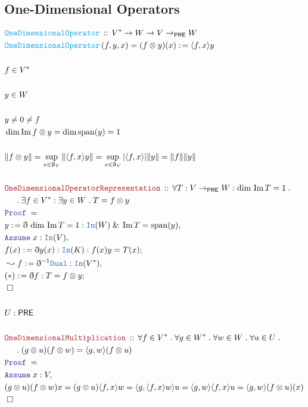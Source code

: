 \documentclass[12pt]{scrartcl}
\newcommand{\TYPE}[1]{\textcolor{NavyBlue}{\mathtt{#1}}}
\newcommand{\FUNC}[1]{\textcolor{Cerulean}{\mathtt{#1}}}
\newcommand{\LOGIC}[1]{\textcolor{Blue}{\mathtt{#1}}}
\newcommand{\THM}[1]{\textcolor{Maroon}{\mathtt{#1}}}
\renewcommand{\.}{\; . \;}
\newcommand{\de}{: \kern 0.1pc =}
\newcommand{\Act}[1]{\left( #1 \right)}
\newcommand{\Theorem}[2]{& \THM{#1} \, :: \, #2 \\ & \Proof = \\ }
\newcommand{\DeclareFunc}[2]{& \FUNC{#1} \, :: \, #2 \\}
\newcommand{\DefineNamedFunc}[4]{&  \FUNC{#1}\Act{#2} = #3 \de #4 \\}
\newcommand{\NewLine}{\\ & \kern 1pc}
\newcommand{\Page}[1]{\begin{align*} #1 \end{align*} \newpage   }
\newcommand{ \bd }{ \ByDef }
\renewcommand{\And}{\; \& \;}
\DeclareMathOperator*{\im}{Im}
\newcommand{\Say}[3]{& #1 \de #2 : #3, \\}
\newcommand{\Conclude}[3]{& #1 \de #2 : #3; \\}
\newcommand{\Derive}[3]{& \leadsto #1 \de #2 : #3, \\}
\newcommand{\A}{\LOGIC{Assume} \;}
\newcommand{\Assume}[2]{& \A #1 : #2, \\}
\newcommand{\QED}{\; \square}
\newcommand{\EndProof}{& \QED \\}
\newcommand{\ByDef}{\eth}
\newcommand{\Proof}{\LOGIC{Proof} \; }
\newcommand{\Ball}{ \mathbb{B} }
\newcommand{\PRE}{\mathsf{PRE}} %
\begin{document}
 \subsection{One-Dimensional Operators}
 \Page{
 \DeclareFunc{OneDimensionalOperator}{ V^* \to W \to V \to_\PRE W }
 \DefineNamedFunc{OneDimensionalOperator}{f,y,x}{(f \otimes y)(x)}{\langle f, x \rangle y }
 \\
 & f \in V^* \\
 \\
 & y \in W \\
 \\
 &  y \neq 0 \neq f \\
 & \dim \im f \otimes y = \dim \mathrm{span}(y) = 1 \\
 \\
 &  \| f \otimes y \|  = \sup_{x \in \Ball_V}  \| \langle f , x \rangle  y  \|= 
 \sup_{x \in \Ball_V} |  \langle f , x \rangle       | \| y \| 
 = \| f \| \| y \|    \\ 
 \\
 \Theorem{ OneDimensionalOperatorRepresentation }
  { \forall  T : V \to_\PRE W : \dim \, \im T = 1  \. 
      \NewLine \.  
    \exists f \in V^* : \exists y \in W \.  T = f \otimes y   }
   \Say{y}{ \bd \, \dim \, \im T = 1 }{ \TYPE{In}(W) \And \im T = \mathrm{span}(y) } 
   \Assume{x}{\TYPE{In}(V)}
   \Conclude{f(x)}{ \bd y (x) }{ \TYPE{In}(K) : f(x)y = T(x) }
   \Derive{f}{ \bd^{-1} \TYPE{Dual} }{ \TYPE{In}(V^*)}
   \Conclude{(*)}{ \bd f}{ T = f \otimes y }  
   \EndProof 
   \\
   & U : \PRE \\
   \\
 \Theorem{OneDimensionalMultiplication}{ 
   \forall f \in V^* \. \forall g \in W^* \.   
   \forall w \in W  \. \forall u \in U \.
    \NewLine \.   
    (g \otimes u) (f \otimes w)  = \langle g, w \rangle (f \otimes u) } 
    \Assume{x}{V}
    &     (g \otimes u) (f \otimes w) x =    (g \otimes u) \langle f, x \rangle w =
    \langle  g, \langle f, x \rangle w  \rangle u = \langle g, w \rangle \langle f, x \rangle u
    = \langle g, w \rangle (f \otimes u)(x) \\
    \EndProof
 }
\end{document}
